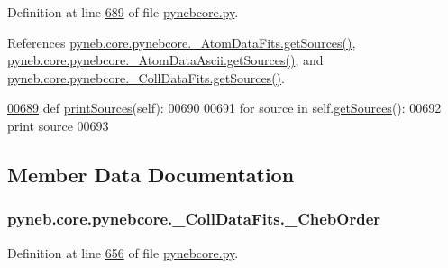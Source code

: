 Definition at line \hyperlink{pynebcore_8py_source_l00689}{689} of file \hyperlink{pynebcore_8py_source}{pynebcore.\+py}.



References \hyperlink{pynebcore_8py_source_l00183}{pyneb.\+core.\+pynebcore.\+\_\+\+Atom\+Data\+Fits.\+get\+Sources()}, \hyperlink{pynebcore_8py_source_l00448}{pyneb.\+core.\+pynebcore.\+\_\+\+Atom\+Data\+Ascii.\+get\+Sources()}, and \hyperlink{pynebcore_8py_source_l00673}{pyneb.\+core.\+pynebcore.\+\_\+\+Coll\+Data\+Fits.\+get\+Sources()}.


\begin{DoxyCode}
\hypertarget{classpyneb_1_1core_1_1pynebcore_1_1___coll_data_fits_l00689}{}\hyperlink{classpyneb_1_1core_1_1pynebcore_1_1___coll_data_fits_a4894e804fd2ea5cf1947de2535d2243f}{00689}     \textcolor{keyword}{def }\hyperlink{classpyneb_1_1core_1_1pynebcore_1_1___coll_data_fits_a4894e804fd2ea5cf1947de2535d2243f}{printSources}(self):
00690         
00691         \textcolor{keywordflow}{for} source \textcolor{keywordflow}{in} self.\hyperlink{classpyneb_1_1core_1_1pynebcore_1_1___coll_data_fits_a13ff2c1aef93336f152a248e534bd104}{getSources}():
00692             \textcolor{keywordflow}{print} source    
00693     
\end{DoxyCode}


\subsection{Member Data Documentation}
\hypertarget{classpyneb_1_1core_1_1pynebcore_1_1___coll_data_fits_aeb6a6f312ca21c1e1b3aa72225a0d442}{}
\subsubsection[{\+\_\+\+Cheb\+Order}]{\setlength{\rightskip}{0pt plus 5cm}pyneb.\+core.\+pynebcore.\+\_\+\+Coll\+Data\+Fits.\+\_\+\+Cheb\+Order\hspace{0.3cm}{\ttfamily [private]}}\label{classpyneb_1_1core_1_1pynebcore_1_1___coll_data_fits_aeb6a6f312ca21c1e1b3aa72225a0d442}


Definition at line \hyperlink{pynebcore_8py_source_l00656}{656} of file \hyperlink{pynebcore_8py_source}{pynebcore.\+py}.



